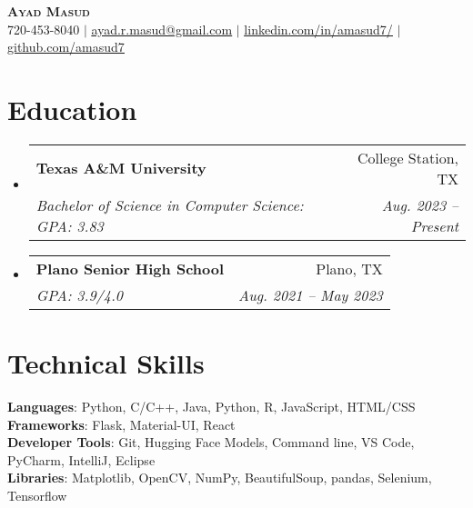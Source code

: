 \documentclass[letterpaper,11pt]{article}
\makeatletter
\newcommand{\resumeSubheading}[4]{
  \vspace{-2pt}\item
    \begin{tabular*}{0.97\textwidth}[t]{l@{\extracolsep{\fill}}r}
      \textbf{#1} & #2 \\
      \textit{\small#3} & \textit{\small #4} \\
    \end{tabular*}\vspace{-7pt}
}
\newcommand{\resumeSubHeadingListStart}{\begin{itemize}[leftmargin=0.15in, label={}]}
\newcommand{\resumeSubHeadingListEnd}{\end{itemize}}
\makeatother
\begin{document}

\begin{center}
    \textbf{\Huge \scshape Ayad Masud} \\ \vspace{1pt}
    \small 720-453-8040 $|$ \href{mailto:ayad.r.masud@gmail.com}{\underline{ayad.r.masud@gmail.com}} $|$ 
    \href{https://linkedin.com/in/amasud7}{\underline{linkedin.com/in/amasud7/}} $|$
    \href{https://github.com/amasud7}{\underline{github.com/amasud7}}
\end{center}


\section{Education}
  \resumeSubHeadingListStart
    \resumeSubheading
      {Texas A\&M University}{College Station, TX}
      {Bachelor of Science in Computer Science: GPA: 3.83}{Aug. 2023 -- Present}
    \resumeSubheading
      {Plano Senior High School}{Plano, TX}
      {GPA: 3.9/4.0}{Aug. 2021 -- May 2023}
  \resumeSubHeadingListEnd

\section{Technical Skills}
\begin{itemize}[leftmargin=0.15in, label={}]
   \small{\item{
    \textbf{Languages}{: Python, C/C++, Java, Python, R, JavaScript, HTML/CSS} \\
    \textbf{Frameworks}{: Flask, Material-UI, React} \\
    \textbf{Developer Tools}{: Git, Hugging Face Models, Command line, VS Code, PyCharm, IntelliJ, Eclipse} \\
    \textbf{Libraries}{: Matplotlib, OpenCV, NumPy, BeautifulSoup, pandas, Selenium, Tensorflow}
   }}
\end{itemize}
\end{document}
